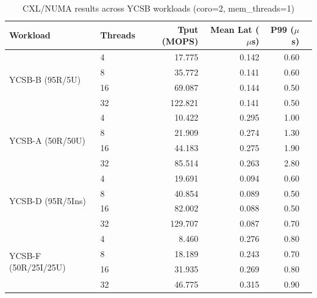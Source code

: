 \documentclass[conference]{IEEEtran}
\begin{document}
\begin{table}[H]
\centering
\caption{CXL/NUMA results across YCSB workloads (coro=2, mem\_threads=1)}
\label{tab:numa-ycsb-all}
\small
\begin{tabular}{@{}llrrrr@{}}
\toprule
\textbf{Workload} & \textbf{Threads} & \textbf{Tput (MOPS)} & \textbf{Mean Lat ($\mu$s)} & \textbf{P99 ($\mu$s)} \\
\midrule
\multirow{4}{*}{YCSB-B (95R/5U)} & 4  & 17.775 & 0.142 & 0.60 \\
  & 8  & 35.772 & 0.141 & 0.60 \\
  & 16 & 69.087 & 0.144 & 0.50 \\
  & 32 & 122.821 & 0.141 & 0.50 \\
\midrule
\multirow{4}{*}{YCSB-A (50R/50U)} & 4  & 10.422 & 0.295 & 1.00 \\
  & 8  & 21.909 & 0.274 & 1.30 \\
  & 16 & 44.183 & 0.275 & 1.90 \\
  & 32 & 85.514 & 0.263 & 2.80 \\
\midrule
\multirow{4}{*}{YCSB-D (95R/5Ins)} & 4  & 19.691 & 0.094 & 0.60 \\
  & 8  & 40.854 & 0.089 & 0.50 \\
  & 16 & 82.002 & 0.088 & 0.50 \\
  & 32 & 129.707 & 0.087 & 0.70 \\
\midrule
\multirow{4}{*}{YCSB-F (50R/25I/25U)} & 4  & 8.460 & 0.276 & 0.80 \\
  & 8  & 18.189 & 0.243 & 0.70 \\
  & 16 & 31.935 & 0.269 & 0.80 \\
  & 32 & 46.775 & 0.315 & 0.90 \\
\bottomrule
\end{tabular}
\end{table}
\end{document}
